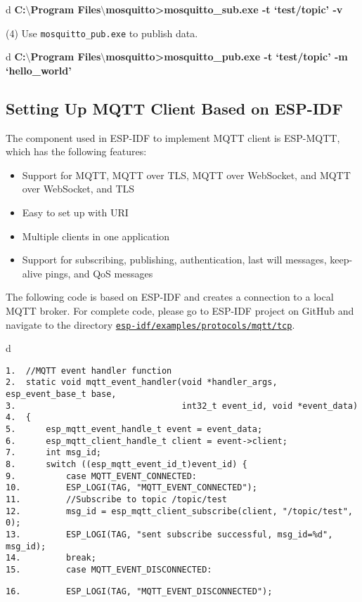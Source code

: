 \documentclass[a4paper,12pt]{book}
\begin{document}
\begin{codebloc}
\begin{tabular}{d}
\textbf{C:$\setminus$Program Files$\setminus$mosquitto>mosquitto\_sub.exe -t ‘test/topic’ -v}
\end{tabular}
\end{codebloc}

(4) Use \verb|mosquitto_pub.exe| to publish data.

\begin{codebloc}
\begin{tabular}{d}
\textbf{C:$\setminus$Program Files$\setminus$mosquitto>mosquitto\_pub.exe -t ‘test/topic’ -m ‘hello\_world’}
\end{tabular}
\end{codebloc}

\subsection{Setting Up MQTT Client Based on ESP-IDF}
The component used in ESP-IDF to implement MQTT client is ESP-MQTT, which has the following features:

\begin{itemize}[noitemsep]
    \item Support for MQTT, MQTT over TLS, MQTT over WebSocket, and MQTT over WebSocket, and TLS
    \item Easy to set up with URI
    \item Multiple clients in one application
    \item Support for subscribing, publishing, authentication, last will messages, keep-alive pings, and QoS messages
\end{itemize}

The following code is based on ESP-IDF and creates a connection to a local MQTT broker. For complete code, please go to ESP-IDF project on GitHub and navigate to the directory \href{https://github.com/espressif/esp-idf/tree/master/examples/protocols/mqtt/tcp}{\texttt{esp-idf/examples/protocols/mqtt/tcp}}.

\begin{codebloc}
\begin{tabular}{d}
\vspace{2pt}
\begin{verbatim}
1.  //MQTT event handler function
2.  static void mqtt_event_handler(void *handler_args, esp_event_base_t base,
3.                                 int32_t event_id, void *event_data)
4.  {
5.      esp_mqtt_event_handle_t event = event_data;
6.      esp_mqtt_client_handle_t client = event->client;
7.      int msg_id;
8.      switch ((esp_mqtt_event_id_t)event_id) {
9.          case MQTT_EVENT_CONNECTED:
10.         ESP_LOGI(TAG, "MQTT_EVENT_CONNECTED");
11.         //Subscribe to topic /topic/test
12.         msg_id = esp_mqtt_client_subscribe(client, "/topic/test", 0);
13.         ESP_LOGI(TAG, "sent subscribe successful, msg_id=%d", msg_id);
14.         break;
15.         case MQTT_EVENT_DISCONNECTED:
\end{verbatim}
\verb|16.         ESP_LOGI(TAG, "MQTT_EVENT_DISCONNECTED");|
\end{tabular}
\end{codebloc}
\end{document}

